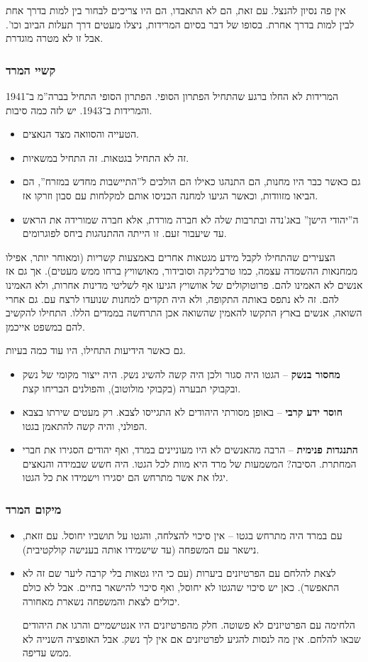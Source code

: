 \documentclass[a4paper]{book}
\begin{document}
	אין פה נסיון להנצל. עם זאת, הם לא התאבדו, הם היו צריכים לבחור בין למות בדרך אחת לבין למות בדרך אחרת. בסופו של דבר בסיום המרידות, ניצלו מעטים דרך תעלות הביוב וכו'. אבל זו לא מטרה מוגדרת. 
	
	
	\subsubsection{קשיי המרד}
	המרידות לא החלו ברגע שהתחיל הפתרון הסופי. הפתרון הסופי התחיל בברה''מ ב־1941 והמרידות ב־1943. יש לזה כמה סיבות. 
	\begin{itemize}
		\item הטעייה והסוואה מצד הנאצים. 
		\item זה לא התחיל בגטאות. זה התחיל במשאיות. 
		\item גם כאשר כבר היו מחנות, הם התנהגו כאילו הם הולכים ל''התיישבות מחדש במזרח'', הם הביאו מזוודות, וכאשר הגיעו למחנה הכניסו אותם למקלחות עם סבון וזרקו אז. 
		\item ה''יהודי הישן'' באג'נדה ובתרבות שלה לא חברה מורדת, אלא חברה שמורידה את הראש עד שיעבור זעם. זו הייתה ההתנהגות ביחס לפוגרומים. 
	\end{itemize}
	הצעירים שהתחילו לקבל מידע מגטאות אחרים באמצעות קשריות (ומאוחר יותר, אפילו ממחנאות ההשמדה עצמה, כמו טרבלינקה וסובידור, מאושוויץ ברחו ממש מעטים). אך גם אז אנשים לא האמינו להם. פרוטוקולים של אוושויץ הגיעו אף לשליטי מדינות אחרות, ולא האמינו להם. זה לא נתפס באותה התקופה, ולא היה תקדים למחנות שנועדו לרצח עם. גם אחרי השואה, אנשים בארץ התקשו להאמין שהשואה אכן התרחשה בממדים הללו. התחילו להקשיב להם במשפט אייכמן. 
	
	גם כאשר הידיעות התחילו, היו עוד כמה בעיות. 
	\begin{itemize}
		\item \textbf{מחסור בנשק} – הגטו היה סגור ולכן היה קשה להשיג נשק. היה ייצור מקומי של נשק ובקבוקי תבערה (בקבוקי מולוטוב), והפולנים הבריחו קצת. 
		\item \textbf{חוסר ידע קרבי} – באופן מסורתי היהודים לא התגייסו לצבא. רק מעטים שירתו בצבא הפולני, והיה קשה להתאמן בגטו. 
		\item \textbf{התנגדות פנימית} – הרבה מהאנשים לא היו מעוניינים במרד, ואף יהודים הסגירו את חברי המחתרת. הסיבה? המשמעות של מרד היא מוות לכל הגטו. היה חשש שבמידה והנאצים יגלו את אשר מתרחש הם יסגירו וישמידו את כל הגטו. 
	\end{itemize}
	
	\subsubsection{מיקום המרד}
	\begin{itemize}
		\item עם במרד היה מתרחש בגטו – אין סיכוי להצלחה, והגטו על תושביו יחוסל. עם זזאת, נישאר עם המשפחה (עד שישמידו אותה בענישה קולקטיבית). 
		\item לצאת להלחם עם הפרטיזנים ביערות (עם כי היו גטאות בלי קרבה ליער שם זה לא התאפשר). כאן יש סיכוי שהגטו לא יחוסל, ואף סיכוי להישאר בחיים. אבל לא כולם יכולים לצאת והמשפחה נשארת מאחורה. 
		
		הלחימה עם הפרטיזנים לא פשוטה. חלק מהפרטיזנים היו אנטישמיים והרגו את היהודים שבאו להלחם. אין מה לנסות להגיע לפרטיזנים אם אין לך נשק. אבל האופציה השנייה לא ממש עדיפה. 
	\end{itemize}
	
\end{document}
